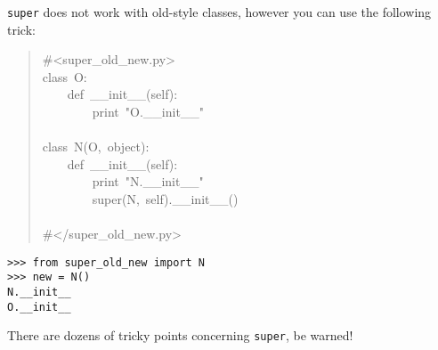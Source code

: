 \documentclass[10pt,a4paper,english]{article}
\begin{document}
\texttt{super} does not work with old-style classes, however you can use the
following trick:
\begin{quote}{\ttfamily \raggedright \noindent
{\#}<super{\_}old{\_}new.py>~\\
class~O:~\\
~~~~def~{\_}{\_}init{\_}{\_}(self):~\\
~~~~~~~~print~"O.{\_}{\_}init{\_}{\_}"~\\
~\\
class~N(O,~object):~\\
~~~~def~{\_}{\_}init{\_}{\_}(self):~\\
~~~~~~~~print~"N.{\_}{\_}init{\_}{\_}"~\\
~~~~~~~~super(N,~self).{\_}{\_}init{\_}{\_}()~\\
~\\
{\#}</super{\_}old{\_}new.py>
}\end{quote}
\begin{verbatim}>>> from super_old_new import N
>>> new = N()
N.__init__
O.__init__\end{verbatim}

There are dozens of tricky points concerning \texttt{super}, be warned!



\hypertarget{subclassing-built-in-types-new-vs-init}{}
\end{document}
